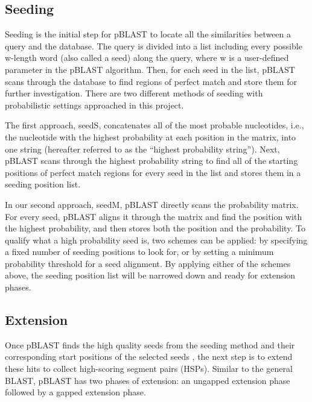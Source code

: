 \documentclass[12pt]{article}
\begin{document}
\subsection{Seeding}
Seeding is the initial step for pBLAST to locate all the similarities between a query and the database. The query is divided into a list including every possible w-length word (also called a seed) along the query, where w is a user-defined parameter in the pBLAST algorithm. Then, for each seed in the list, pBLAST scans through the database to find regions of perfect match and store them for further investigation. There are two different methods of seeding with probabilistic settings approached in this project.

The first approach, seedS, concatenates all of the most probable nucleotides, i.e., the nucleotide with the highest probability at each position in the matrix, into one string (hereafter referred to as the “highest probability string”).  Next, pBLAST scans through the highest probability string to find all of the starting positions of perfect match regions for every seed in the list and stores them in a seeding position list.

In our second approach, seedM, pBLAST directly  scans the probability matrix. For every seed, pBLAST aligns it through the matrix and find the position with the highest probability, and then stores both the position and the probability. To qualify what a high probability seed is, two schemes can be applied: by specifying a fixed number of seeding positions to look for, or by setting a minimum probability threshold for a seed alignment. By applying either of the schemes above, the seeding position list will be narrowed down and ready for extension phases.

\subsection{Extension}
Once pBLAST finds the high quality seeds from the seeding method and their corresponding start positions of the selected seeds , the next step is to extend these hits to collect high-scoring segment pairs (HSPs). Similar to the general BLAST, pBLAST has two phases of extension: an ungapped extension phase followed by a gapped extension phase.
\end{document}
